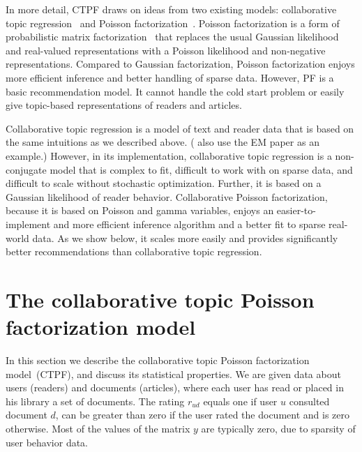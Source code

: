 \documentclass{article}
\begin{document}
In more detail, CTPF draws on ideas from two existing models:
collaborative topic regression~\cite{Wang:2011a} and Poisson
factorization~\cite{Gopalan:2013b}.  Poisson factorization is a form
of probabilistic matrix factorization~\cite{Salakhutdinov:2008} that
replaces the usual Gaussian likelihood and real-valued representations
with a Poisson likelihood and non-negative representations.  Compared
to Gaussian factorization, Poisson factorization enjoys more efficient
inference and better handling of sparse data.  However, PF is a basic
recommendation model. It cannot handle the cold start problem or
easily give topic-based representations of readers and articles.

Collaborative topic regression is a model of text and reader data that
is based on the same intuitions as we described above.  (\citet{Wang:2011a}
also use the EM paper as an example.)  However,
in its implementation, collaborative topic regression is a
non-conjugate model that is complex to fit, difficult to work with on
sparse data, and difficult to scale without stochastic optimization.
Further, it is based on a Gaussian likelihood of reader behavior.
Collaborative Poisson factorization, because it is based on Poisson
and gamma variables, enjoys an easier-to-implement and more efficient
inference algorithm and a better fit to sparse real-world data.  As we
show below, it scales more easily and provides significantly better
recommendations than collaborative topic regression.


\section{The collaborative topic Poisson factorization model}
\label{sec:model}
In this section we describe the collaborative topic Poisson
factorization model~(CTPF), and discuss its statistical properties. We
are given data about users (readers) and documents (articles), where
each user has read or placed in his library a set of documents. The
rating $r_{ud}$ equals one if user $u$ consulted document $d$, can be
greater than zero if the user rated the document and is zero
otherwise.  Most of the values of the matrix $y$ are typically zero,
due to sparsity of user behavior data.
\end{document}
